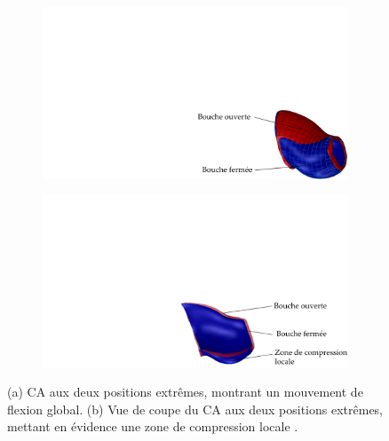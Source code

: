 \begin{figure}[!htbp]
\begin{center}
	\begin{subfigure}[b]{0.4\textwidth}
    	\captionsetup{justification=centering}
		\includegraphics[trim={17cm 0cm 0cm 11cm},clip,width=\textwidth]{../Chap2/Figure/earcanal_3D_a.pdf}
		\caption{}
		\label{fig:earcanal_3D_a}
	\end{subfigure}
\hfillx
	\begin{subfigure}[b]{0.4\textwidth}
    	\captionsetup{justification=centering}
		\includegraphics[trim={15cm 0cm 0cm 11cm},clip,width=\textwidth]{../Chap2/Figure/earcanal_3D_b.pdf}
		\caption{}
		\label{fig:earcanal_3D_b}  
	\end{subfigure}
	\caption{(a) CA aux deux positions extrêmes, montrant un mouvement de flexion global. (b) Vue de coupe du CA aux deux positions extrêmes, mettant en évidence une zone de compression locale \cite{Carioli2016}.}
	\label{fig:earcanal_3D}
\end{center}	
\end{figure} 
